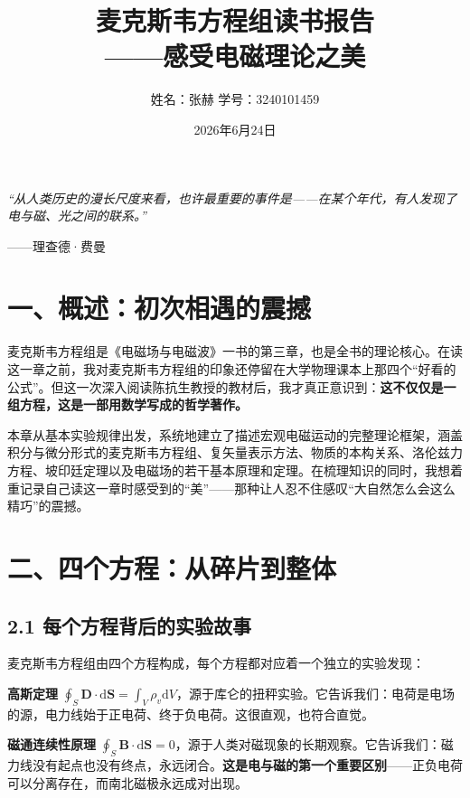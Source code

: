 \documentclass[12pt,a4paper]{ctexart}
\title{\textbf{麦克斯韦方程组读书报告}\\[0.3\baselineskip]
\normalsize ——感受电磁理论之美}
\author{姓名：张赫 \quad 学号：3240101459}
\date{2026年6月24日}
\begin{document}
\maketitle

\begin{center}
\emph{“从人类历史的漫长尺度来看，也许最重要的事件是——在某个年代，有人发现了电与磁、光之间的联系。”}
\end{center}
\begin{flushright}
——理查德·费曼
\end{flushright}

\vspace{0.5cm}

\section*{一、概述：初次相遇的震撼}

麦克斯韦方程组是《电磁场与电磁波》一书的第三章，也是全书的理论核心。在读这一章之前，我对麦克斯韦方程组的印象还停留在大学物理课本上那四个“好看的公式”。但这一次深入阅读陈抗生教授的教材后，我才真正意识到：\textbf{这不仅仅是一组方程，这是一部用数学写成的哲学著作。}

本章从基本实验规律出发，系统地建立了描述宏观电磁运动的完整理论框架，涵盖积分与微分形式的麦克斯韦方程组、复矢量表示方法、物质的本构关系、洛伦兹力方程、坡印廷定理以及电磁场的若干基本原理和定理。在梳理知识的同时，我想着重记录自己读这一章时感受到的“美”——那种让人忍不住感叹“大自然怎么会这么精巧”的震撼。

\section*{二、四个方程：从碎片到整体}

\subsection*{2.1 每个方程背后的实验故事}

麦克斯韦方程组由四个方程构成，每个方程都对应着一个独立的实验发现：

\textbf{高斯定理} $\oint_S \mathbf{D} \cdot \mathrm{d}\mathbf{S} = \int_V \rho_v \mathrm{d}V$，源于库仑的扭秤实验。它告诉我们：电荷是电场的源，电力线始于正电荷、终于负电荷。这很直观，也符合直觉。

\textbf{磁通连续性原理} $\oint_S \mathbf{B} \cdot \mathrm{d}\mathbf{S} = 0$，源于人类对磁现象的长期观察。它告诉我们：磁力线没有起点也没有终点，永远闭合。\textbf{这是电与磁的第一个重要区别}——正负电荷可以分离存在，而南北磁极永远成对出现。
\end{document}
